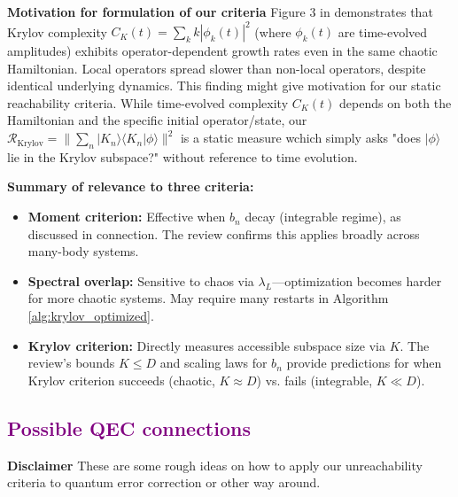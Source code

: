 \documentclass[ a4paper, 
                amsfonts, 
                amssymb, 
                amsmath, 
                reprint, 
                showkeys, 
                nofootinbib,
                superscriptaddress, 
                onecolumn, 
                notitlepage,
                aps,
                pra,
                longbibliography]{revtex4-1}
\newcommand{\tom}[1]{\textcolor{purple}{#1}}
\theoremstyle{definition}
\begin{document}
\textbf{Motivation for formulation of our criteria} Figure 3 in \cite{Sahu_2023} demonstrates that Krylov complexity $C_K(t) = \sum_k k |\phi_k(t)|^2$ (where $\phi_k(t)$ are time-evolved amplitudes) exhibits operator-dependent growth rates even in the same chaotic Hamiltonian. Local operators spread slower than non-local operators, despite identical underlying dynamics.
This finding might give motivation for our static reachability criteria. While time-evolved complexity $C_K(t)$ depends on both the Hamiltonian and the specific initial operator/state, our $\mathcal{R}_{\text{Krylov}} = \|\sum_n |K_n\rangle\langle K_n|\phi\rangle\|^2$ is a static measure wchich simply asks "does $|\phi\rangle$ lie in the Krylov subspace?" without reference to time evolution.


\textbf{Summary of relevance to three criteria:}
\begin{itemize}
\item \textbf{Moment criterion:} Effective when $b_n$ decay (integrable regime), as discussed in \cite{takahashi2025krylovcomplexityhamiltoniandeformations} connection. The review confirms this applies broadly across many-body systems.
\item \textbf{Spectral overlap:} Sensitive to chaos via $\lambda_L$—optimization becomes harder for more chaotic systems. May require many restarts in Algorithm \ref{alg:krylov_optimized}.
\item \textbf{Krylov criterion:} Directly measures accessible subspace size via $K$. The review's bounds $K \leq D$ and scaling laws for $b_n$ provide predictions for when Krylov criterion succeeds (chaotic, $K \approx D$) vs. fails (integrable, $K \ll D$).
\end{itemize}

\subsection{\tom{Possible QEC connections}}

\textbf{Disclaimer} These are some rough ideas on how to apply our unreachability criteria to quantum error correction or other way around.





\end{document}
